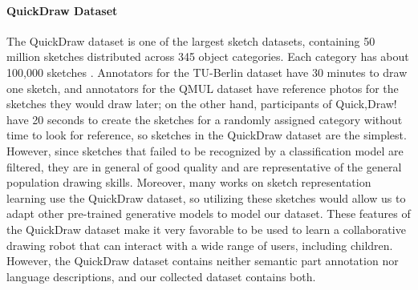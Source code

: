 \paragraph{QuickDraw Dataset}
The QuickDraw dataset is one of the largest sketch datasets, containing 50 million sketches distributed across 345 object categories. Each category has about 100,000 sketches \citep{ha2017neural}. 
Annotators for the TU-Berlin dataset have 30 minutes to draw one sketch, and annotators for the QMUL dataset have reference photos for the sketches they would draw later; on the other hand, participants of Quick,Draw! have 20 seconds to create the sketches for a randomly assigned category without time to look for reference, so sketches in the QuickDraw dataset are the simplest. However, since sketches that failed to be recognized by a classification model are filtered, they are in general of good quality and are representative of the general population drawing skills. Moreover, many works on sketch representation learning use the QuickDraw dataset, so utilizing these sketches would allow us to adapt other pre-trained generative models to model our dataset. 
These features of the QuickDraw dataset make it very favorable to be used to learn a collaborative drawing robot that can interact with a wide range of users, including children. However, the QuickDraw dataset contains neither semantic part annotation nor language descriptions, and our collected dataset contains both.   

